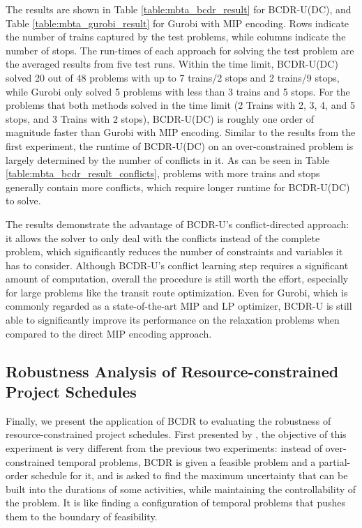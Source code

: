 \documentclass[jair,twoside,11pt,theapa]{article}
\begin{document}
The results are shown in Table \ref{table:mbta_bcdr_result} for BCDR-U(DC), and
Table \ref{table:mbta_gurobi_result} for Gurobi with MIP encoding. Rows indicate the number of trains captured by the test problems, while
columns indicate the number of stops. The run-times of each approach for
solving the test problem are the averaged results from five test runs. Within
the time limit, BCDR-U(DC) solved 20 out of 48 problems with up to 7 trains/2 stops
and 2 trains/9 stops, while Gurobi only solved 5 problems with less than 3
trains and 5 stops. For the problems that both methods solved in the time limit
(2 Trains with 2, 3, 4, and 5 stops, and 3 Trains with 2 stops), BCDR-U(DC) is
roughly one order of magnitude faster than Gurobi with MIP encoding. Similar to
the results from the first experiment, the runtime of BCDR-U(DC) on an
over-constrained problem is largely determined by the number of conflicts in it.
As can be seen in Table \ref{table:mbta_bcdr_result_conflicts}, problems with
more trains and stops generally contain more conflicts, which require longer
runtime for BCDR-U(DC) to solve.


The results demonstrate the advantage of BCDR-U's conflict-directed approach: it
allows the solver to only deal with the conflicts instead of the complete
problem, which significantly reduces the number of constraints and variables it
has to consider. Although BCDR-U's conflict learning step requires a significant
amount of computation, overall the procedure is still worth the effort,
especially for large problems like the transit route optimization. Even for
Gurobi, which is commonly regarded as a state-of-the-art MIP and LP optimizer,
BCDR-U is still able to significantly improve its performance on the relaxation
problems when compared to the direct MIP encoding approach.


\subsection{Robustness Analysis of Resource-constrained Project Schedules}


Finally, we present the application of BCDR to evaluating the robustness of
resource-constrained project schedules. First presented by
, the objective of
this experiment is very different from the previous two experiments:
instead of over-constrained temporal problems, BCDR is given a feasible problem
and a partial-order schedule for it, and is asked to find the maximum
uncertainty that can be built into the durations of some activities, while
maintaining the controllability of the problem. It is like finding a
configuration of temporal problems that pushes them to the boundary of feasibility.
\end{document}
